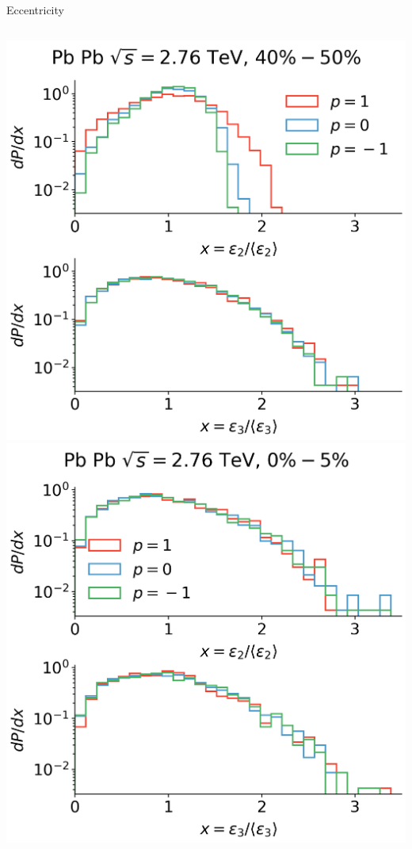 \documentclass[11pt, aspectratio=169]{beamer}
\begin{document}
\begin{frame}{Eccentricity}
\begin{columns}
\begin{column}{.4\textwidth}
\begin{overprint}
\includegraphics[width=\textwidth]{ecc_fluct_40-50.png}
\includegraphics[width=\textwidth]{ecc_fluct_0-5.png}

\end{overprint}
\end{column}
\end{columns}
\end{frame}
\end{document}
